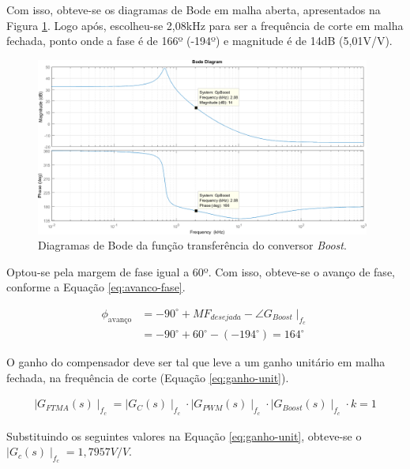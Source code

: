 \documentclass[a4paper]{article}
\begin{document}
{Com isso, obteve-se os diagramas de Bode em malha aberta, apresentados na Figura \ref{fig:bode}. Logo após, escolheu-se 2,08kHz para ser a frequência de corte em malha fechada, ponto onde a fase é de 166º (-194º) e magnitude é de 14dB (5,01V/V).

\begin{figure}[H]
	\centering
	\includegraphics[width=0.98\textwidth]{GpBoost_freq_corte_escolhida.png}
	\caption{Diagramas de Bode da função transferência do conversor \emph{Boost}.}
	\label{fig:bode}
\end{figure}

Optou-se pela margem de fase igual a 60º. Com isso, obteve-se o avanço de fase, conforme a Equação \ref{eq:avanco-fase}.

\begin{equation}
\label{eq:avanco-fase}
\begin{split}
\phi_{\text{avanço}} & = -90^{\circ} + MF_{desejada} - \angle G_{Boost}\mid_{f_c} \\
& = -90^{\circ} + 60^{\circ} - (-194^{\circ}) = 164^{\circ}
\end{split}
\end{equation}

O ganho do compensador deve ser tal que leve a um ganho unitário em malha fechada, na frequência de corte (Equação \ref{eq:ganho-unit}).

\begin{equation}
\label{eq:ganho-unit}
\begin{split}
\mid G_{FTMA}\left(s\right)\mid_{f_c} = \mid G_{C}\left(s\right)\mid_{f_c} \cdot \mid G_{PWM}\left(s\right)\mid_{f_c} \cdot \mid G_{Boost}\left(s\right)\mid_{f_c} \cdot k = 1
\end{split}
\end{equation}

Substituindo os seguintes valores na Equação \ref{eq:ganho-unit}, obteve-se o  $\mid G_c\left( s \right) \mid_{f_c} = 1,7957V/V$.

}
\end{document}
